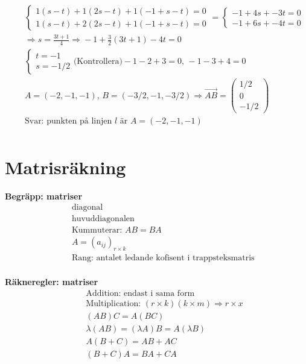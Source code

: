 \begin{align*}
  &\quad
  \left\{\begin{array}{r}
  1(s-t) + 1(2s-t) + 1(-1+s-t) = 0  \\
  1(s-t) + 2(2s-t) + 1(-1+s-t) = 0  
  \end{array}\right. =
  \left\{\begin{array}{r}
  -1 + 4s + -3t = 0  \\
  -1 + 6s + -4t = 0 
  \end{array}\right. \\
  &\quad  \Rightarrow{} s=\frac{3t+1}{4} \Rightarrow{} -1 + \frac{3}{2} (3t+1) -4t = 0 \\
  &\quad 
  \left\{\begin{array}{r}
  t=-1  \\
  s=-1/2
  \end{array}\right. \text{(Kontrollera)} -1 -2 +3 = 0, \, -1 -3 +4 = 0 \\
  &\quad  A= (-2,-1,-1), \, B= (-3/2,-1,-3/2)  \Rightarrow\overrightarrow{AB}=
  \begin{pmatrix} 1/2 \\ 0 \\ -1/2 \end{pmatrix} \\
  &\quad  \text{Svar: punkten på linjen $l$ är } A= (-2,-1,-1) \\
\end{align*}


\newpage

\section{Matrisräkning}
\textbf{Begräpp: matriser}
\begin{align*} 
  &\quad  \text{diagonal} \\
  &\quad  \text{huvuddiagonalen} \\
  &\quad  \text{Kummuterar: } AB=BA \\
  &\quad  A={(a_{ij})}_{r\times{k}} \\
  &\quad  \text{Rang: antalet ledande kofisent i trappsteksmatris } \\ 
\end{align*}

\textbf{Räkneregler: matriser}
\begin{align*}
  &\quad  \text{Addition: endast i sama form} \\
  &\quad  \text{Multiplication: } (r\times{k})(k\times{m}) \Rightarrow r\times{x}  \\
  &\quad  (AB)C=A(BC) \\
  &\quad  \lambda(AB) = (\lambda{A})B = A(\lambda{B}) \\
  &\quad  A(B+C) = AB + AC \\
  &\quad  (B+C)A = BA+CA \\
\end{align*}

